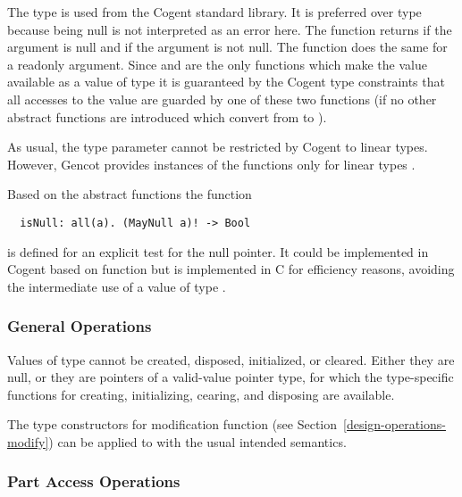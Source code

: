The type  is used from the Cogent standard library. It is preferred over type  because being null
is not interpreted as an error here.
The function  returns  if the argument is null and  if the argument  is not null.
The function  does the same for a readonly argument. 
Since  and  are the only functions which make the value available as a value of type  
it is guaranteed by the Cogent type constraints that all accesses to the value are guarded by one of these two functions
(if no other abstract functions are introduced which convert from  to ).

As usual,
the type parameter  cannot be restricted by Cogent to linear types. However, Gencot provides instances of the functions only for
linear types .

Based on the abstract functions the function
\begin{verbatim}
  isNull: all(a). (MayNull a)! -> Bool
\end{verbatim}
is defined for an explicit test for the null pointer. It could be implemented in Cogent based on function  but
is implemented in C for efficiency reasons, avoiding the intermediate use of a value of type .

\subsubsection{General Operations}

Values of type  cannot be created, disposed, initialized, or cleared. Either they are null, or they are pointers of
a valid-value pointer type, for which the type-specific functions for creating, initializing, cearing, and disposing are available.

The type constructors for modification function (see Section~\ref{design-operations-modify}) can be applied to  
with the usual intended semantics.

\subsubsection{Part Access Operations}

